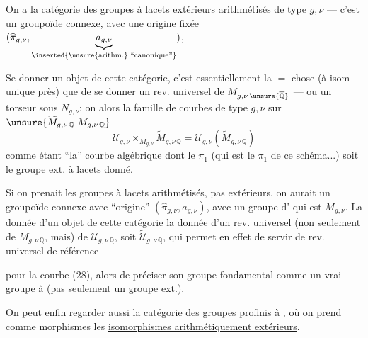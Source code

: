 On a la catégorie des groupes à lacets  extérieurs arithmétisés de type $g,\nu$ --- c'est un groupoïde connexe, avec une origine fixée $(\widehat{\pi}_{g,\nu},\underbrace{a_{g,\nu}}_{\inserted{\text{\unsure{arithm.} ``canonique''}}})$,


Se donner un objet de cette catégorie, c'est essentiellement la $=$ chose (à isom unique près) que de se donner un rev. universel  de $M_{g,\nu\,\unsure{\overline{\mathbb Q}}}$ --- ou un torseur sous $N_{g,\nu}$; on  alors la famille de courbes de type $g,\nu$ sur $\unsure{\widetilde M_{g,\nu\,\mathbb Q}|M_{g,\nu\,\mathbb Q}}$
\[
 \mathcal U_{g,\nu}\times_{M_{g,\nu}}\widetilde M_{g,\nu\,\mathbb Q}
 =\mathcal U_{g,\nu}(\widetilde M_{g,\nu\,\mathbb Q})
\tag{28}
\]
comme étant ``la'' courbe algébrique dont le $\pi_1$  (qui est  le $\pi_1$ de ce schéma...) soit le groupe ext. à lacets donné.

Si on prenait les groupes à lacets arithmétisés, pas extérieurs, on aurait  un groupoïde connexe avec ``origine'' $(\widehat{\pi}_{g,\nu},a_{g,\nu})$, avec un groupe d' qui est $M_{g,\nu}$. La donnée d'un objet de cette catégorie   la donnée d'un rev. universel (non seulement de $M_{g,\nu\,\mathbb Q}$, mais) de $\mathcal U_{g,\nu\,\mathbb Q}$, soit $\widetilde{\mathcal U}_{g,\nu\,\mathbb Q}$, qui permet en effet de servir de rev. universel de référence


pour la courbe  (28),  alors de préciser son groupe fondamental comme un vrai groupe à  (pas seulement un groupe ext.).

On peut enfin regarder aussi la catégorie des groupes profinis à  , où on prend comme morphismes les \uline{isomorphismes arithmétiquement extérieurs}.

